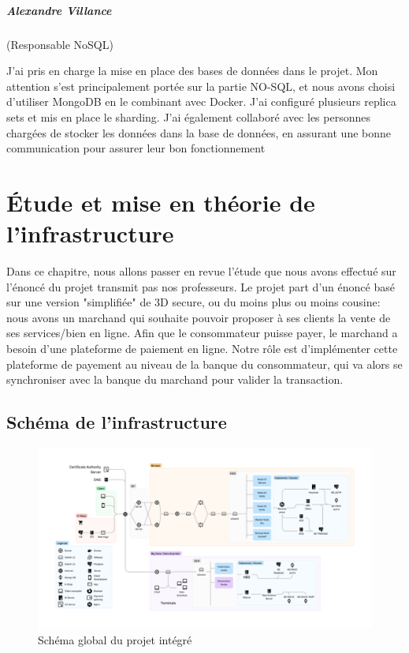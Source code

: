 \paragraph{Alexandre Villance} (Responsable NoSQL)

J'ai pris en charge la mise en place des bases de données dans le projet. Mon attention s'est
principalement portée sur la partie NO-SQL, et nous avons choisi d'utiliser MongoDB en le combinant
avec Docker. J'ai configuré plusieurs replica sets et mis en place le sharding. J'ai également collaboré
avec les personnes chargées de stocker les données dans la base de données, en assurant une bonne
communication pour assurer leur bon fonctionnement

\chapter{Étude et mise en théorie de l'infrastructure}

Dans ce chapitre, nous allons passer en revue l'étude que nous avons effectué sur l'énoncé du projet transmit pas nos professeurs. Le projet part d'un énoncé basé sur une version "simplifiée" de 3D secure, ou du moins plus ou moins cousine: nous avons un marchand qui souhaite pouvoir proposer à ses clients la vente de ses services/bien en ligne. Afin que le consommateur puisse payer, le marchand a besoin d'une plateforme de paiement en ligne. Notre rôle est d'implémenter cette plateforme de payement au niveau de la banque du consommateur, qui va alors se synchroniser avec la banque du marchand pour valider la transaction.

\section{Schéma de l'infrastructure}

\begin{figure}[H]
    \centering
    \includegraphics[width=\textwidth]{./img/Schéma Projet Intégré.png}
    \caption{Schéma global du projet intégré}
    \label{fig:infrastructure}
\end{figure}